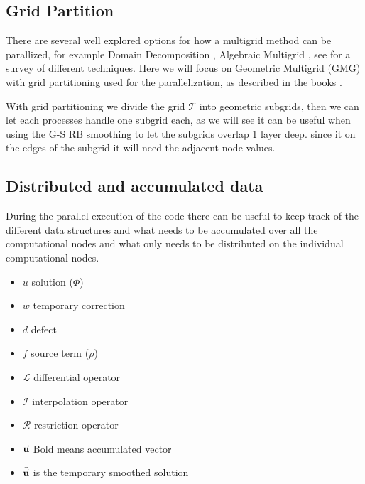 		\subsection{Grid Partition}
			\label{sec:grid_partitioning}
			There are several well explored options for how a multigrid method can be parallized, for example Domain Decomposition \citep{Arraras2015}, Algebraic Multigrid \citep{StUben2001}, see \citet{Chow2006} for a survey of different techniques. Here we will focus on Geometric Multigrid (GMG) with grid partitioning used for the parallelization, as described in the books \cite{Trottenberg2000,Trottenberg}.

			With grid partitioning we divide the grid \(\mathcal{T}\) into geometric subgrids, then we can let each processes handle one subgrid each, as we will see it can be useful when using the G-S RB smoothing to let the subgrids overlap 1 layer deep. since it on the edges of the subgrid it will need the adjacent node values.

		\subsection{Distributed and accumulated data}
			During the parallel execution of the code there can be useful to keep track of the different data structures and what needs to be accumulated over all the computational nodes and what only needs to be distributed on the individual computational nodes. 

			\begin{itemize}
				\item \(u\) solution (\(\Phi\))
				\item \(w\) temporary correction
				\item \(d\) defect
				\item \(f\) source term (\(\rho\)) 
				\item \(\mathcal{L}\) differential operator
				\item \(\mathcal{I}\) interpolation operator
				\item \(\mathcal{R}\) restriction operator
				\item \( \va{u}\) Bold means accumulated vector
				\item \( \tilde{\va{ u }} \) is the temporary smoothed solution
			\end{itemize}

